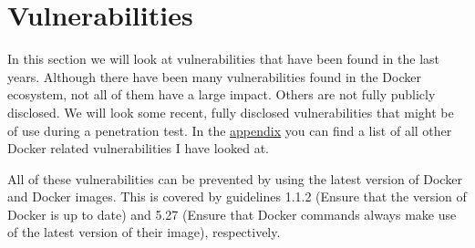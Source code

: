 \section{Vulnerabilities}\label{section:vulnerabilities}
In this section we will look at vulnerabilities that have been found in the last years. Although there have been many vulnerabilities found in the Docker ecosystem, not all of them have a large impact. Others are not fully publicly disclosed. We will look some recent, fully disclosed vulnerabilities that might be of use during a penetration test. In the \hyperref[appendix:CVE-List]{appendix} you can find a list of all other Docker related vulnerabilities I have looked at.

\hfill

All of these vulnerabilities can be prevented by using the latest version of Docker and Docker images. This is covered by guidelines 1.1.2 (Ensure that the version of Docker is up to date) and 5.27 (Ensure that Docker commands always make use of the latest version of their image), respectively.








